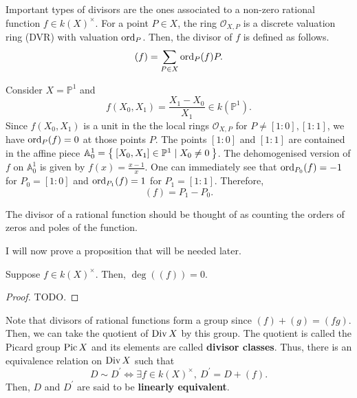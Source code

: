 Important types of divisors are the ones associated to a non-zero rational
function $f\in k(X)^{\times}$. For a point $P\in X$, the ring
$\mathscr{O}_{X,P}$ is a discrete valuation ring (DVR) with valuation
$\operatorname{ord}_{P}$. Then, the divisor of $f$ is defined as follows.
\[
  (f) = \sum_{P\in X}\operatorname{ord}_{P}(f)P.
\]
\begin{ex}
  Consider $X=\mathbb{P}^{1}$ and
  \[f(X_{0}, X_{1})=\frac{X_{1}-X_{0}}{X_{1}}\in k(\mathbb{P}^{1}).\]
  Since $f(X_{0}, X_{1})$ is a unit in the the local rings
  $\mathscr{O}_{X,P}$ for $P\neq [1:0], [1:1]$, we have $\operatorname{ord}_{P}(f)=0$
  at those points $P$. The points $[1:0]$ and $[1:1]$ are contained in the
  affine piece $\mathbb{A}_{0}^{1}=\Set{[X_{0},X_{1}]\in\mathbb{P}^{1}\mid
    X_{0}\neq 0}$. The dehomogenised version of $f$ on $\mathbb{A}_{0}^{1}$ is
  given by $f(x)=\frac{x-1}x$. One can immediately see that
  $\operatorname{ord}_{P_{0}}(f)=-1$ for $P_{0}=[1:0]$ and $\operatorname{ord}_{P_{1}}(f)=1$ for
  $P_{1}=[1:1]$. Therefore,
  \[(f)=P_{1}-P_{0}.\]
\end{ex}
\begin{rem}
  The divisor of a rational function should be thought of as counting the
  orders of zeros and poles of the function.
\end{rem}
I will now prove a proposition that will be needed later.
\begin{prop}\label{prop:rational_deg_zero}
  Suppose $f\in k(X)^{\times}$. Then, $\deg\left((f)\right)=0$.
\end{prop}
\begin{proof}
  TODO.
\end{proof}
\begin{rem}
  Note that divisors of rational functions form a group since
  $(f)+(g)=(fg)$. Then, we can take the quotient of $\operatorname{Div} X$ by this group.
  The quotient is called the Picard group $\operatorname{Pic} X$ and its elements are
  called \textbf{divisor classes}. Thus, there is an equivalence relation on
  $\operatorname{Div} X$ such that
  \[
    D\sim D^{\prime}\iff \exists f\in k(X)^{\times},\ D^{\prime}=D+(f).
  \]
  Then, $D$ and $D^{\prime}$ are said to be \textbf{linearly equivalent}.
\end{rem}

